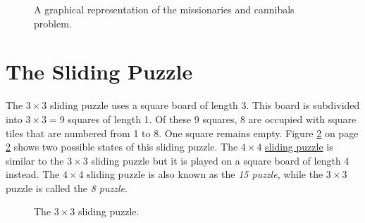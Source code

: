 \begin{figure}[!ht]
  \centering
  \caption{A graphical representation of the missionaries and cannibals problem.}
  \label{fig:missionaries.pdf}
\end{figure}


\section{The Sliding Puzzle} 
The $3 \times 3$ sliding puzzle uses a
square board of length 3.  This board is subdivided into $3 \times 3 = 9$ squares of length 1.  Of
these 9 squares, 8 are occupied with square tiles that are numbered from 1 to 8.  One square remains
empty. Figure \ref{fig:8-puzzle.pdf} on page \ref{fig:8-puzzle.pdf} shows two possible states of this
sliding puzzle.  The $4 \times 4$ \href{https://en.wikipedia.org/wiki/15_puzzle}{sliding puzzle}
is similar to the $3 \times 3$ sliding puzzle but it is played on a square board of length 4
instead.  The $4 \times 4$ sliding puzzle is also known as the \emph{\color{blue}15 puzzle}, while the $3 \times 3$ puzzle is
called the \emph{\color{blue}8 puzzle}.

\begin{figure}[!ht]
\centering
{}  
\caption{The $3 \times 3$ sliding puzzle.}
\label{fig:8-puzzle.pdf}
\end{figure}

